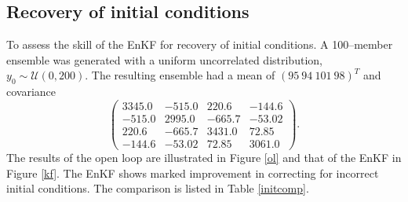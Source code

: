 \documentclass[fleqn, letterpaper]{amsart}
\begin{document}
\subsection{Recovery of initial conditions}
To assess the skill of the EnKF for recovery of initial conditions. A 100--member ensemble was generated with a uniform uncorrelated distribution, $y_0\sim\mathcal{U}(0,200)$.
The resulting ensemble had a mean of $(95\ 94\ 101\ 98)^T$ and covariance
\[\left(\begin{array}{cccc} 3345.0 & -515.0 & 220.6 & -144.6\\ -515.0 & 2995.0 & -665.7 & -53.02\\ 220.6 & -665.7 & 3431.0 & 72.85\\ -144.6 & -53.02 & 72.85 & 3061.0 \end{array}\right).\]
The results of the open loop are illustrated in Figure \ref{ol} and that of the EnKF in Figure \ref{kf}. The EnKF shows marked improvement in correcting for incorrect initial conditions. The comparison is listed in Table \ref{initcomp}.
\end{document}
